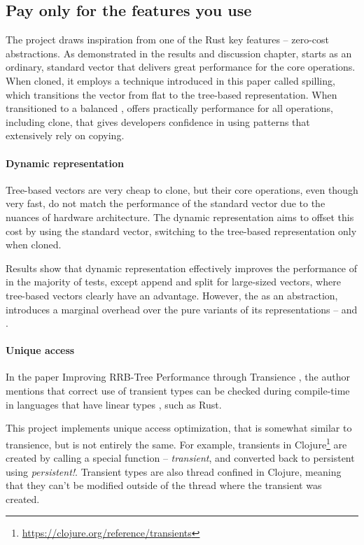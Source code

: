 \subsection{Pay only for the features you use}
The project draws inspiration from one of the Rust key features -- zero-cost abstractions. As demonstrated in the results and discussion chapter, \pvec{} starts as an ordinary, standard vector that delivers great performance for the core operations. When cloned, it employs a technique introduced in this paper called spilling, which transitions the vector from flat to the tree-based representation. When transitioned to a balanced \rrbvec{}, \pvec{} offers practically  performance for all operations, including clone, that gives developers confidence in using patterns that extensively rely on copying. 

\paragraph{Dynamic representation}
Tree-based vectors are very cheap to clone, but their core operations, even though very fast, do not match the performance of the standard vector due to the nuances of hardware architecture. The dynamic representation aims to offset this cost by using the standard vector, switching to the tree-based representation only when cloned. 

Results show that dynamic representation effectively improves the performance of \pvec{} in the majority of tests, except append and split for large-sized vectors, where tree-based vectors clearly have an advantage. However, the \pvec{} as an abstraction, introduces a marginal overhead over the pure variants of its representations -- \stdvec{} and \rrbvec{}.

\paragraph{Unique access}
In the paper Improving RRB-Tree Performance through Transience \cite{improving-performance-through-transience}, the author mentions that correct use of transient types can be checked during compile-time in languages that have linear types \cite{linear-types-can-change-the-world}, such as Rust. 

This project implements unique access optimization, that is somewhat similar to transience, but is not entirely the same. For example, transients in Clojure\footnote{\url{https://clojure.org/reference/transients}} are created by calling a special function -- \emph{transient}, and converted back to persistent using \emph{persistent!}. Transient types are also thread confined in Clojure, meaning that they can't be modified outside of the thread where the transient was created. 

